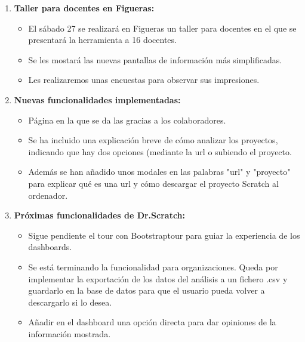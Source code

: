 \documentclass[a4paper,12pt]{letter}
\begin{document}
\begin{letter}
\begin{enumerate}
    
    \item{\textbf {Taller para docentes en Figueras:}}
    \begin{itemize}
            \item {El sábado 27 se realizará en Figueras un taller para docentes
                    en el que se presentará la herramienta a 16 docentes.}
            \item {Se les mostará las nuevas pantallas de información más 
                    simplificadas.}
            \item {Les realizaremos unas encuestas para observar sus impresiones.}
    \end{itemize}
    
    \item{\textbf {Nuevas funcionalidades implementadas:}}
    \begin{itemize}
            \item {Página en la que se da las gracias a los colaboradores.}
            \item {Se ha incluido una explicación breve de cómo analizar los 
                    proyectos, indicando que hay dos opciones (mediante la url o 
                    subiendo el proyecto.}
            \item {Además se han añadido unos modales en las palabras "url" y
                    "proyecto" para explicar qué es una url y cómo descargar
                    el proyecto Scratch al ordenador.}
    \end{itemize}

    \item{\textbf {Próximas funcionalidades de Dr.Scratch:}}
    \begin{itemize}
        \item {Sigue pendiente el tour con Bootstraptour para guiar la experiencia
                de los dashboards.}
        \item {Se está terminando la funcionalidad para organizaciones. Queda por
                implementar la exportación de los datos del análisis a un fichero
                .csv y guardarlo en la base de datos para que el usuario pueda volver
                a descargarlo si lo desea.}
        \item {Añadir en el dashboard una opción directa para dar opiniones de 
                la información mostrada.}
    \end{itemize}


\end{enumerate}

\end{letter}
\end{document}
